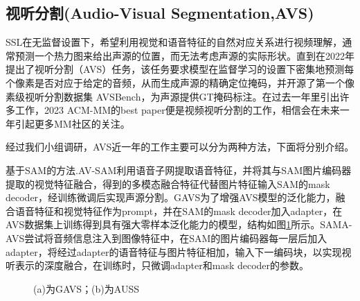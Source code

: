 \documentclass[12pt]{article}
\begin{document}
\subsection{视听分割(Audio-Visual Segmentation,AVS)}
SSL在无监督设置下，希望利用视觉和语音特征的自然对应关系进行视频理解，通常预测一个热力图来给出声源的位置，而无法考虑声源的实际形状。直到\cite{17}在2022年提出了视听分割（AVS）任务，该任务要求模型在监督学习的设置下密集地预测每个像素是否对应于给定的音频，从而生成声源的精确定位掩码，并开源了第一个像素级视听分割数据集 AVSBench，为声源提供GT掩码标注。在过去一年里引出许多工作，2023 ACM-MM的best paper\cite{s10}便是视频视听分割的工作，相信会在未来一年引起更多MM社区的关注。

经过我们小组调研，AVS近一年的工作主要可以分为两种方法，下面将分别介绍。

基于SAM\cite{sam}的方法.AV-SAM\cite{s1}利用语音子网提取语音特征，并将其与SAM图片编码器提取的视觉特征融合，得到的多模态融合特征代替图片特征输入SAM的mask decoder，经训练微调后实现声源分割。GAVS\cite{s6}为了增强AVS模型的泛化能力，融合语音特征和视觉特征作为prompt，并在SAM的mask decoder加入adapter，在AVS数据集上训练得到具有强大零样本泛化能力的模型，结构如图\ref{ref5}所示。SAMA-AVS\cite{s9}尝试将音频信息注入到图像特征中，在SAM的图片编码器每一层后加入adapter，将经过adapter的语音特征与图片特征相加，输入下一编码块，以实现视听表示的深度融合，在训练时，只微调adapter和mask decoder的参数。
\begin{figure}[!h]
  \centering

  \caption{(a)为GAVS\cite{s6}；(b)为AUSS\cite{s2}}
    \label{ref5}
\end{figure}
\end{document}
